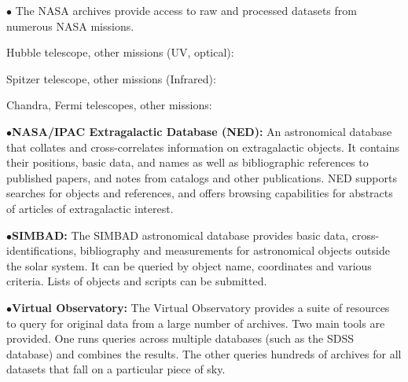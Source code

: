 \medskip

\item{$\bullet$}
The NASA archives provide access to raw and processed datasets from numerous NASA missions. 
\item{}
Hubble telescope, other missions (UV, optical):	\item{} 
\item{}
Spitzer telescope, other missions (Infrared): \item{}
\item{}
Chandra, Fermi telescopes, other missions: \item{}

\medskip

\item{$\bullet$}{\bf NASA/IPAC Extragalactic Database (NED):}
An astronomical database that collates and cross-correlates information on extragalactic objects. It contains their positions, basic data, and names as well as bibliographic references to published papers, and notes from catalogs and other publications. NED supports searches for objects and references, and offers browsing capabilities for abstracts of articles of extragalactic interest.
	\item{}

\medskip

\item{$\bullet$}{\bf SIMBAD:}
The SIMBAD astronomical database provides basic data, cross-identifications, bibliography and measurements for astronomical objects outside the solar system. It can be queried by object name, coordinates and various criteria. Lists of objects and scripts can be submitted.
	\item{}

\medskip

\item{$\bullet$}{\bf Virtual Observatory:}
The Virtual Observatory provides a suite of resources to query for original data from a large number of archives. Two main tools are provided. One runs queries across multiple databases (such as the SDSS database) and combines the results. The other queries hundreds of archives for all datasets that fall on a particular piece of sky.
	\item{}

\medskip
\medskip

